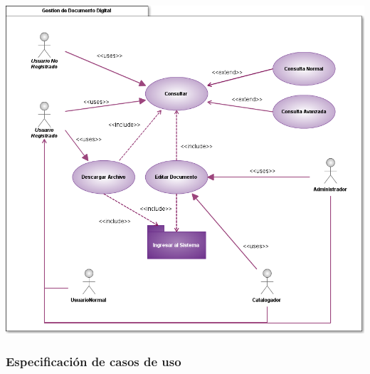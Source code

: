 \documentclass[]{article}
\begin{document}
        \begin{minipage}[c]{1\linewidth}
                \begin{center}
                \includegraphics[scale=.5]{casosUso/CUGestionDocumento}
                \end{center}
        \end{minipage}
        
        
        \newpage                
                \subsubsection{Especificación de casos de uso}
                        
                        
                        
                        
                        
                        
                        
                        
                        
                        
\end{document}

